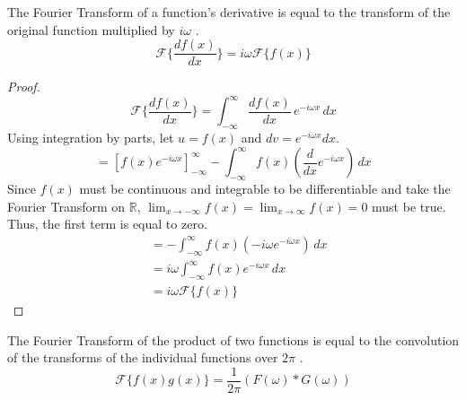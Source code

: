 \begin{theorem}
    \label{fourier_derivative}
    The Fourier Transform of a function's derivative is equal to the transform of the original function multiplied by $i \omega$ \citep{bahouri2011fourier, 3Blue1Brown_fourier_2018}.
    \begin{equation}
        \mathcal{F}\{ \frac{d f(x)}{dx} \} = i \omega \mathcal{F}\{ f(x) \}
    \end{equation}
\end{theorem}

\begin{proof}
    \[ \mathcal{F}\{ \frac{d f(x)}{dx} \} = \int_{-\infty}^{\infty} \frac{d f(x)}{dx}  \, e^{-i \omega x} \,dx \]
    Using integration by parts, let \(u = f(x)\) and \(dv = e^{-i \omega x} dx\).
    \[ = \left[ f(x) e^{-i \omega x} \right]_{-\infty}^{\infty} - \int_{-\infty}^{\infty} f(x) \left( \frac{d}{dx} e^{-i \omega x} \right) \,dx \]
    Since \(f(x)\) must be continuous and integrable to be differentiable and take the Fourier Transform on \(\mathbb{R}\), \(\lim_{x \to -\infty} f(x)=\lim_{x \to \infty} f(x)=0\) must be true. Thus, the first term is equal to zero. 
    \begin{align*}
        &= - \int_{-\infty}^{\infty} f(x) \left( -i \omega e^{-i \omega x} \right) \,dx \\
        &= i \omega \int_{-\infty}^{\infty} f(x) e^{-i \omega x} \,dx \\
        &= i \omega \mathcal{F}\{ f(x) \}
    \end{align*}
\end{proof}

\begin{theorem}
    \label{fourier_multiplication}
    The Fourier Transform of the product of two functions is equal to the convolution of the transforms of the individual functions over \(2 \pi\) \citep{bahouri2011fourier, 3Blue1Brown_fourier_2018}.
    \begin{equation}
        \mathcal{F}\{ f(x) g(x) \} = \frac{1}{2 \pi}( F(\omega) * G(\omega) )
    \end{equation}
\end{theorem}

